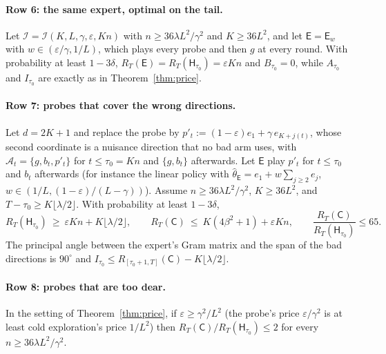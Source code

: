 \documentclass[anon]{alt2027} %
\newcommand{\eps}{\varepsilon}
\newcommand{\Cold}{\mathsf{C}}
\newcommand{\Exp}{\mathsf{E}}
\newcommand{\Hyb}{\mathsf{H}}
\begin{document}
\paragraph{Row 6: the same expert, optimal on the tail.}
\begin{proposition}
\label{prop:cat-tail}
Let $\mathcal I=\mathcal I(K,L,\gamma,\eps,Kn)$ with $n\ge36\lambda L^2/\gamma^2$ and
$K\ge36L^2$, and let $\Exp=\Exp_w$ with $w\in(\eps/\gamma,1/L)$, which plays every
probe and then $g$ at every round. With probability at least $1-3\delta$,
$R_T(\Exp)=R_T(\Hyb_{\tau_0})=\eps Kn$ and $B_{\tau_0}=0$, while $A_{\tau_0}$
and $I_{\tau_0}$ are exactly as in Theorem~\ref{thm:price}.
\end{proposition}

\paragraph{Row 7: probes that cover the wrong directions.}
\begin{proposition}
\label{prop:cat-wrong}
Let $d=2K+1$ and replace the probe by
$p'_t:=(1-\eps)e_1+\gamma\,e_{K+j(t)}$, whose second coordinate is a nuisance
direction that no bad arm uses, with $\mathcal A_t=\{g,b_t,p'_t\}$ for
$t\le\tau_0=Kn$ and $\{g,b_t\}$ afterwards. Let $\Exp$ play $p'_t$ for
$t\le\tau_0$ and $b_t$ afterwards (for instance the linear policy with
$\widehat\theta_{\Exp}=e_1+w\sum_{j\ge2}e_j$, $w\in(1/L,(1-\eps)/(L-\gamma))$).
Assume $n\ge36\lambda L^2/\gamma^2$, $K\ge36L^2$, and $T-\tau_0\ge K\lfloor\lambda/2\rfloor$.
With probability at least $1-3\delta$,
\[
R_T(\Hyb_{\tau_0})\ \ge\ \eps Kn+K\lfloor\lambda/2\rfloor,
\qquad
R_T(\Cold)\ \le\ K(4\beta^2+1)+\eps Kn,
\qquad
\frac{R_T(\Cold)}{R_T(\Hyb_{\tau_0})}\le65 .
\]
The principal angle between the expert's Gram matrix and the span of the bad
directions is $90^\circ$ and $I_{\tau_0}\le R_{[\tau_0+1,T]}(\Cold)-K\lfloor\lambda/2\rfloor$.
\end{proposition}

\paragraph{Row 8: probes that are too dear.}
\begin{corollary}
\label{cor:cat-dear}
In the setting of Theorem~\ref{thm:price}, if $\eps\ge \gamma^2/L^2$ (the probe's
price $\eps/\gamma^2$ is at least cold exploration's price $1/L^2$) then
$R_T(\Cold)/R_T(\Hyb_{\tau_0})\le2$ for every $n\ge36\lambda L^2/\gamma^2$.
\end{corollary}
\end{document}
